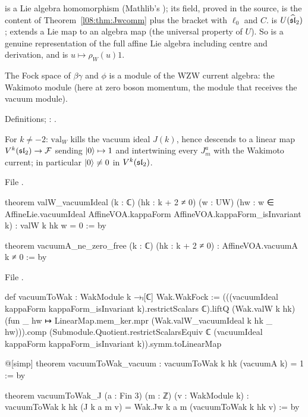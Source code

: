 \begin{dictionary}
 is a Lie algebra homomorphism (Mathlib's ); its  field, proved
in the source, is the content of Theorem~\ref{l08:thm:Jwcomm} plus the bracket with $\ell_0$ and $C$.
 is $U(\widehat{\mathfrak{sl}}_2)$; \allowbreak{} extends a Lie map to an algebra map
(the universal property of $U$). So  is a genuine representation of the full affine Lie
algebra including centre and derivation, and  is $u\mapsto\rho_W(u)1$.
\end{dictionary}

\begin{physics}
The Fock space of $\beta\gamma$ and $\phi$ is a module of the WZW current algebra: the Wakimoto module
(here at zero boson momentum, the module that receives the vacuum module).
\end{physics}

\begin{status}
Definitions; : \lean{[propext, Classical.}\allowbreak{}\allowbreak\lean{sound]}.
\end{status}

\begin{theorem}\label{l08:thm:vacfree}
For $k\ne-2$: $\mathrm{val}_W$ kills the vacuum ideal $J(k)$, hence descends to a linear map
$V^k(\mathfrak{sl}_2)\to\mathcal{F}$ sending $|0\rangle\mapsto1$ and intertwining every $J^a_m$ with the
Wakimoto current; in particular $|0\rangle\ne0$ in $V^k(\mathfrak{sl}_2)$.
\end{theorem}

\noindent File .
\begin{leancode}
theorem valW_vacuumIdeal (k : ℂ) (hk : k + 2 ≠ 0) (w : UW)
    (hw : w ∈ AffineLie.vacuumIdeal AffineVOA.kappaForm AffineVOA.kappaForm_isInvariant k) :
    valW k hk w = 0 := by

theorem vacuumA_ne_zero_free (k : ℂ) (hk : k + 2 ≠ 0) : AffineVOA.vacuumA k ≠ 0 := by
\end{leancode}
\noindent File .
\begin{leancode}
def vacuumToWak : WakModule k →ₗ[ℂ] Wak.WakFock :=
  (((vacuumIdeal kappaForm kappaForm_isInvariant k).restrictScalars ℂ).liftQ
      (Wak.valW k hk) (fun _ hw ↦ LinearMap.mem_ker.mpr (Wak.valW_vacuumIdeal k hk _ hw))).comp
    (Submodule.Quotient.restrictScalarsEquiv ℂ
      (vacuumIdeal kappaForm kappaForm_isInvariant k)).symm.toLinearMap

@[simp] theorem vacuumToWak_vacuum : vacuumToWak k hk (vacuumA k) = 1 := by

theorem vacuumToWak_J (a : Fin 3) (m : ℤ) (v : WakModule k) :
    vacuumToWak k hk (J k a m v) = Wak.Jw k a m (vacuumToWak k hk v) := by
\end{leancode}

